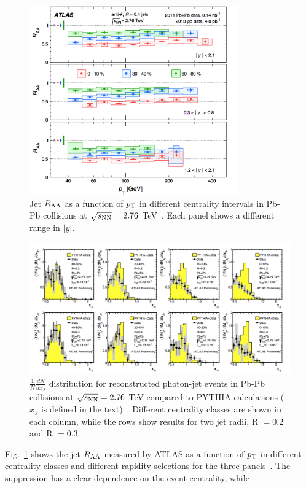 \begin{figure}[!ht]
  \centering
  \includegraphics[width=9cm]{FigCap1/ATLASjetsRaa.png}
  \caption{Jet $R_{\rm AA}$ as a function of $p_{\rm T}$ in different centrality
intervals in Pb-Pb collisions at $\sqrt{s_{\rm NN}} = 2.76$ TeV~\cite{Aad:2014bxa}. Each panel shows a different range in $|y|$.}
  \label{fig:ATLASjetsRaa}
\end{figure}
\begin{figure}[!ht]
  \centering
  \includegraphics[width=15cm]{FigCap1/ATLASdiijetGammaZ.png}
  \caption{$\frac{1}{N}\frac{dN}{dx_J}$ distribution for reconstructed photon-jet events in Pb-Pb collisions at $\sqrt{s_{\rm NN}} = 2.76$ TeV compared to PYTHIA calculations ($x_J$ is defined in the text)~\cite{ATLAS-CONF-2012-121}. Different centrality classes are shown in each column, while the rows show results for two jet radii, R $= 0.2$ and R $=0.3$.}
  \label{fig:ATLASdijetAsymm}
\end{figure} 
Fig.~\ref{fig:ATLASjetsRaa} shows the jet $R_{\rm AA}$ measured by ATLAS 
as a function of $p_{\rm T}$ in different centrality classes and different 
rapidity selections for the three panels~\cite{Aad:2014bxa}. The 
suppression has a clear dependence on the event centrality, while 
